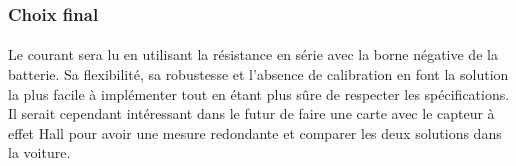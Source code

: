 	\subsubsection*{Choix final}
	\paragraph*{}
	Le courant sera lu en utilisant la résistance en série avec la borne négative de la batterie. Sa flexibilité, sa robustesse et l'absence de calibration en font la solution la plus facile à implémenter tout en étant plus sûre de respecter les spécifications. Il serait cependant intéressant dans le futur de faire une carte avec le capteur à effet Hall pour avoir une mesure redondante et comparer les deux solutions dans la voiture.
